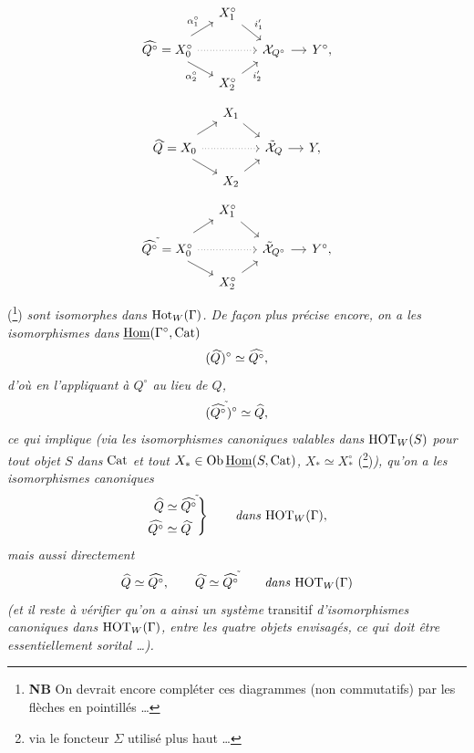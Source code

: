 \setcounter{footnote}{90}

\[
\begin{tikzcd}[row sep=small, column sep=small]
 & X_1^\circ \arrow[dr,"i^{\prime}_{1}"] & & \\
\widehat{Q^\circ} = X_0^\circ \arrow[ur,"\alpha_1^\circ"] \arrow[dr,"\alpha_2^\circ"'] \arrow[rr,dotted] & & \mathcal{X}_{Q^\circ} \arrow[r] & Y^\circ, \\
 & X_2^\circ \arrow[ur,"i^{\prime}_{2}"'] & &
\end{tikzcd}
\]
\[
\begin{tikzcd}[row sep=small, column sep=small]
 & X_1 \arrow[dr] & & \\
\widehat{Q}\tld = X_0 \arrow[ur] \arrow[dr] \arrow[rr,dotted] & & \tilde{\mathcal{X}}_{Q} \arrow[r] & Y, \\
 & X_2 \arrow[ur] & &
\end{tikzcd}
\]
\[
\begin{tikzcd}[row sep=small, column sep=small]
 & X_1^\circ \arrow[dr] & & \\
\widehat{Q^\circ}\tld = X_0^\circ \arrow[ur] \arrow[dr] \arrow[rr,dotted] & & \tilde{\mathcal{X}}_{Q^\circ} \arrow[r] & Y^\circ, \\
 & X_2^\circ \arrow[ur] & &
\end{tikzcd}
\]
(\footnote{\textbf{NB} On devrait encore compléter ces diagrammes (non commutatifs) par les flèches en pointillés \dots}) \textit{sont isomorphes dans} $\mathrm{Hot}_W(\Gamma)$\textit{. De façon plus précise encore, on a les isomorphismes dans} $\underline{\mathrm{Hom}}(\Gamma^\circ,\mathrm{Cat})$
\[
(\widehat{Q}^{\tilde{}})^\circ \simeq \widehat{Q^\circ},
\]
\textit{d'où en l'appliquant à $Q^\circ$ au lieu de $Q$,}
\[
(\widehat{Q^\circ}^{\tilde{}})^\circ \simeq \widehat{Q},
\]
\textit{ce qui implique (via les isomorphismes canoniques valables dans} $\mathrm{HOT}_W(S)$ \textit{pour tout objet $S$ dans} $\mathrm{Cat}$ \textit{et tout} $X_* \in \mathrm{Ob}\,\underline{\mathrm{Hom}}(S,\mathrm{Cat})$\textit{,} $X_* \simeq X_*^\circ$ (\footnote{via le foncteur $\Sigma$ utilisé plus haut \dots})\textit{), qu'on a les isomorphismes canoniques}
\[
\left.\begin{aligned}
\widehat{Q} &\simeq \widehat{Q^\circ}^{\tilde{}} \\
\widehat{Q^\circ} &\simeq \widehat{Q}^{\tilde{}}
\end{aligned}\right\}
\qquad \text{\textit{dans} } \mathrm{HOT}_W(\Gamma),
\]
\textit{mais aussi directement}
\[
\widehat{Q} \simeq \widehat{Q^\circ}, \qquad \widehat{Q}^{\tilde{}} \simeq \widehat{Q^\circ}^{\tilde{}} \qquad \text{\textit{dans} } \mathrm{HOT}_W(\Gamma)
\]
\textit{(et il reste à vérifier qu'on a ainsi un système} transitif \textit{d'isomorphismes canoniques dans} $\mathrm{HOT}_W(\Gamma)$\textit{, entre les quatre objets envisagés, ce qui doit être essentiellement sorital \dots).}

